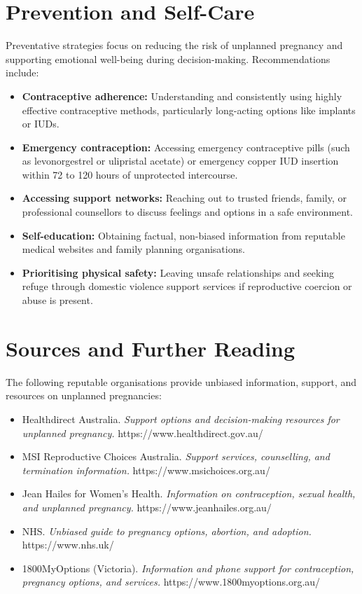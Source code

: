 \section*{Prevention and Self-Care}
Preventative strategies focus on reducing the risk of unplanned pregnancy and supporting emotional well-being during decision-making. Recommendations include:
\begin{itemize}
    \item \textbf{Contraceptive adherence:} Understanding and consistently using highly effective contraceptive methods, particularly long-acting options like implants or IUDs.
    \item \textbf{Emergency contraception:} Accessing emergency contraceptive pills (such as levonorgestrel or ulipristal acetate) or emergency copper IUD insertion within 72 to 120 hours of unprotected intercourse.
    \item \textbf{Accessing support networks:} Reaching out to trusted friends, family, or professional counsellors to discuss feelings and options in a safe environment.
    \item \textbf{Self-education:} Obtaining factual, non-biased information from reputable medical websites and family planning organisations.
    \item \textbf{Prioritising physical safety:} Leaving unsafe relationships and seeking refuge through domestic violence support services if reproductive coercion or abuse is present.
\end{itemize}

\section*{Sources and Further Reading}
The following reputable organisations provide unbiased information, support, and resources on unplanned pregnancies:
\begin{itemize}
    \item Healthdirect Australia. \textit{Support options and decision-making resources for unplanned pregnancy.} https://www.healthdirect.gov.au/
    \item MSI Reproductive Choices Australia. \textit{Support services, counselling, and termination information.} https://www.msichoices.org.au/
    \item Jean Hailes for Women's Health. \textit{Information on contraception, sexual health, and unplanned pregnancy.} https://www.jeanhailes.org.au/
    \item NHS. \textit{Unbiased guide to pregnancy options, abortion, and adoption.} https://www.nhs.uk/
    \item 1800MyOptions (Victoria). \textit{Information and phone support for contraception, pregnancy options, and services.} https://www.1800myoptions.org.au/
\end{itemize}
